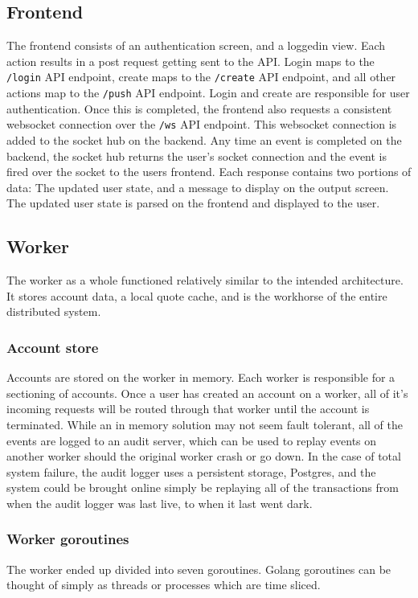 \subsection{Frontend}
The frontend consists of an authentication screen, and a loggedin view.
Each action results in a post request getting sent to the API.
Login maps to the \texttt{/login} API endpoint, create maps to the \texttt{/create} API endpoint, and all other actions map to the \texttt{/push} API endpoint.
Login and create are responsible for user authentication.
Once this is completed, the frontend also requests a consistent websocket connection over the \texttt{/ws} API endpoint.
This websocket connection is added to the socket hub on the backend.
Any time an event is completed on the backend, the socket hub returns the user’s socket connection and the event is fired over the socket to the users frontend.
Each response contains two portions of data: The updated user state, and a message to display on the output screen.
The updated user state is parsed on the frontend and displayed to the user.

\subsection{Worker}
The worker as a whole functioned relatively similar to the intended architecture.
It stores account data, a local quote cache, and is the workhorse of the entire distributed system.

\subsubsection{Account store}
Accounts are stored on the worker in memory.
Each worker is responsible for a sectioning of accounts.
Once a user has created an account on a worker, all of it’s incoming requests will be routed through that worker until the account is terminated.
While an in memory solution may not seem fault tolerant, all of the events are logged to an audit server, which can be used to replay events on another worker should the original worker crash or go down.
In the case of total system failure, the audit logger uses a persistent storage, Postgres, and the system could be brought online simply be replaying all of the transactions from when the audit logger was last live, to when it last went dark.

\subsubsection{Worker goroutines}
The worker ended up divided into seven goroutines.
Golang goroutines can be thought of simply as threads or processes which are time sliced.

